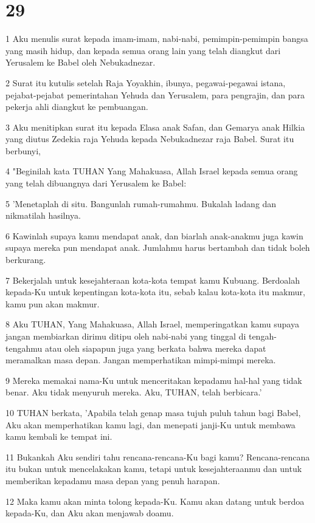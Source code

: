 \chapter{29}

\par 1 Aku menulis surat kepada imam-imam, nabi-nabi, pemimpin-pemimpin bangsa yang masih hidup, dan kepada semua orang lain yang telah diangkut dari Yerusalem ke Babel oleh Nebukadnezar.
\par 2 Surat itu kutulis setelah Raja Yoyakhin, ibunya, pegawai-pegawai istana, pejabat-pejabat pemerintahan Yehuda dan Yerusalem, para pengrajin, dan para pekerja ahli diangkut ke pembuangan.
\par 3 Aku menitipkan surat itu kepada Elasa anak Safan, dan Gemarya anak Hilkia yang diutus Zedekia raja Yehuda kepada Nebukadnezar raja Babel. Surat itu berbunyi,
\par 4 "Beginilah kata TUHAN Yang Mahakuasa, Allah Israel kepada semua orang yang telah dibuangnya dari Yerusalem ke Babel:
\par 5 'Menetaplah di situ. Bangunlah rumah-rumahmu. Bukalah ladang dan nikmatilah hasilnya.
\par 6 Kawinlah supaya kamu mendapat anak, dan biarlah anak-anakmu juga kawin supaya mereka pun mendapat anak. Jumlahmu harus bertambah dan tidak boleh berkurang.
\par 7 Bekerjalah untuk kesejahteraan kota-kota tempat kamu Kubuang. Berdoalah kepada-Ku untuk kepentingan kota-kota itu, sebab kalau kota-kota itu makmur, kamu pun akan makmur.
\par 8 Aku TUHAN, Yang Mahakuasa, Allah Israel, memperingatkan kamu supaya jangan membiarkan dirimu ditipu oleh nabi-nabi yang tinggal di tengah-tengahmu atau oleh siapapun juga yang berkata bahwa mereka dapat meramalkan masa depan. Jangan memperhatikan mimpi-mimpi mereka.
\par 9 Mereka memakai nama-Ku untuk menceritakan kepadamu hal-hal yang tidak benar. Aku tidak menyuruh mereka. Aku, TUHAN, telah berbicara.'
\par 10 TUHAN berkata, 'Apabila telah genap masa tujuh puluh tahun bagi Babel, Aku akan memperhatikan kamu lagi, dan menepati janji-Ku untuk membawa kamu kembali ke tempat ini.
\par 11 Bukankah Aku sendiri tahu rencana-rencana-Ku bagi kamu? Rencana-rencana itu bukan untuk mencelakakan kamu, tetapi untuk kesejahteraanmu dan untuk memberikan kepadamu masa depan yang penuh harapan.
\par 12 Maka kamu akan minta tolong kepada-Ku. Kamu akan datang untuk berdoa kepada-Ku, dan Aku akan menjawab doamu.
